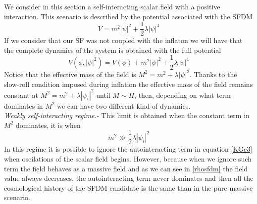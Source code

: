 \documentclass[twocolumn,           %
               showpacs,            %
               preprintnumbers,     %
               aps,                 %
               prl,          	    %
               letterpaper,             %
               superscriptaddress,      %
               nofootinbib,         %
               tightenlines,        %
               floats,floatfix      %
               ,usenatbib,
               ]{revtex4-1}
\begin{document}
We consider in this section a self-interacting scalar field with a positive interaction. This scenario is described by the potential associated with the SFDM
\begin{equation}
V = m^2|\psi|^2+\frac{1}{2}\lambda |\psi|^4
\end{equation}
If we consider that our SF was not coupled with the inflaton we will have that the complete dynamics of the system is obtained with the full potential 
\begin{equation}
V(\phi,|\psi|^2)=V(\phi)+m^2|\psi|^2+\frac{1}{2}\lambda|\psi|^4
\end{equation}
Notice that the effective mass of the field is $M^2=m^2+\lambda|\psi|^2$. Thanks to the slow-roll condition imposed during inflation the effective mass of the field remains constant at $M^2=m^2+\lambda|\psi_i|^2$ until $M\sim H$, then, depending on what term dominates in $M^2$ we can have two different kind of dynamics. 
\\

\textit{Weakly self-interacting regime.-} This limit is obtained when the constant term in $M^2$ dominates, it is when
\begin{equation}\label{consw}
m^2\gg \frac{1}{2}\lambda|\psi_i|^2
\end{equation}
In this regime it is possible to ignore the autointeracting term in equation \eqref{KGe3} when oscilations of the scalar field begins. However, because when we ignore such term the field behaves as a massive field and as we can see in \eqref{rhosfdm} the field value always decreases, the autointeracting term never dominates and then all the cosmological history of the SFDM candidate is the same than in the pure massive scenario. 
\\
\end{document}
